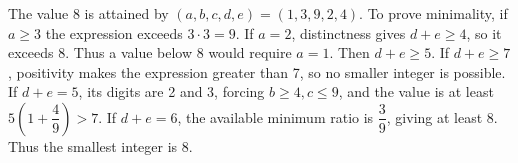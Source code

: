 The value 8 is attained by $(a,b,c,d,e)=(1,3,9,2,4)$. To prove minimality, if $a\ge3$ the expression exceeds $3\cdot3=9$. If $a=2$, distinctness gives $d+e\ge4$, so it exceeds 8. Thus a value below 8 would require $a=1$. Then $d+e\ge5$. If $d+e\ge7$, positivity makes the expression greater than 7, so no smaller integer is possible. If $d+e=5$, its digits are 2 and 3, forcing $b\ge4,c\le9$, and the value is at least $5 (1 + \dfrac{4}{9}) > 7$. If $d+e=6$, the available minimum ratio is $\dfrac{3}{9}$, giving at least 8. Thus the smallest integer is $\boxed8$.
